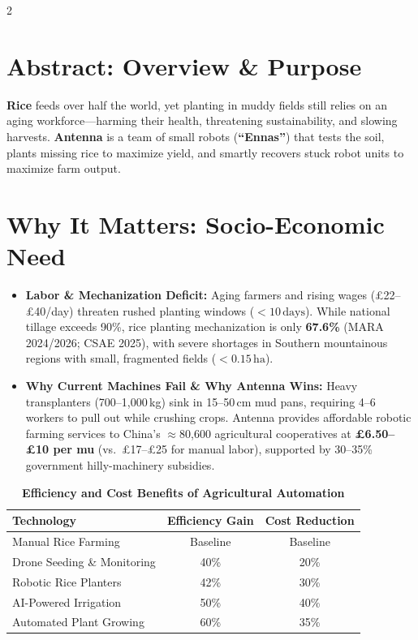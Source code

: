 \documentclass[9pt,a4paper]{article}
\begin{document}
\begin{multicols}{2}

\section{\textbf{Abstract: Overview \& Purpose}}
\textbf{Rice} feeds over half the world, yet planting in muddy fields still relies on an aging workforce—harming their health, threatening sustainability, and slowing harvests. \textbf{Antenna} is a team of small robots (\textbf{``Ennas''}) that tests the soil, plants missing rice to maximize yield, and smartly recovers stuck robot units to maximize farm output.

\section{\textbf{Why It Matters: Socio-Economic Need}}
\begin{itemize}
    \item \textbf{Labor \& Mechanization Deficit:} Aging farmers and rising wages (\pounds 22--\pounds 40/day) threaten rushed planting windows ($<10\,\text{days}$). While national tillage exceeds 90\%, rice planting mechanization is only \textbf{67.6\%} (MARA 2024/2026; CSAE 2025), with severe shortages in Southern mountainous regions with small, fragmented fields ($<0.15\,\text{ha}$).
    \item \textbf{Why Current Machines Fail \& Why Antenna Wins:} Heavy transplanters (700--1,000\,kg) sink in 15--50\,cm mud pans, requiring 4--6 workers to pull out while crushing crops. Antenna provides affordable robotic farming services to China's $\approx$80,600 agricultural cooperatives at \textbf{\pounds 6.50--\pounds 10 per mu} (vs.\ \pounds 17--\pounds 25 for manual labor), supported by 30--35\% government hilly-machinery subsidies.
\end{itemize}

\begin{table}[H]
\centering
\caption{\textbf{Efficiency and Cost Benefits of Agricultural Automation}}
\label{tab:automation_benefits}
\scriptsize
\renewcommand{\arraystretch}{1.0}
\vspace{1pt}
\begin{tabular}{lcc}
\toprule
\textbf{Technology} & \textbf{Efficiency Gain} & \textbf{Cost Reduction} \\
\midrule
Manual Rice Farming & Baseline & Baseline \\
Drone Seeding \& Monitoring & 40\% & 20\% \\
Robotic Rice Planters & 42\% & 30\% \\
AI-Powered Irrigation & 50\% & 40\% \\
Automated Plant Growing & 60\% & 35\% \\
\bottomrule
\end{tabular}
\vspace{1.5pt}


\end{table}
\end{multicols}
\end{document}
